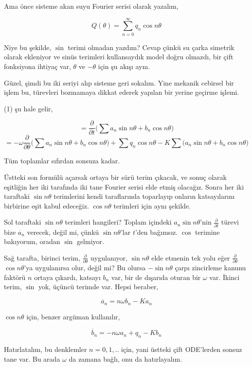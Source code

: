 \documentclass[12pt,fleqn]{article}\usepackage{../../common}
\begin{document}
Ama önce sisteme akan suyu Fourier serisi olarak yazalım, 

$$ 
Q(\theta) = \sum _{n=0}^{\infty} q_n \cos n\theta
$$

Niye bu şekilde, $\sin$ terimi olmadan yazdım?  Cevap çünkü su çarka
simetrik olarak ekleniyor ve sinüs terimleri kullansaydık model doğru
olmazdı, bir çift fonksiyona ihtiyaç var, $\theta$ ve $-\theta$ için şu
akışı aynı. 

Güzel, şimdi bu iki seriyi alıp sisteme geri sokalım. Yine mekanik cebirsel
bir işlem bu, türevleri bozmamaya dikkat ederek yapılan bir yerine geçirme
işlemi.

(1) şu hale gelir, 

$$ 
= \frac{\partial }{\partial t} \bigg(
\sum a_n \sin n\theta + b_n \cos n\theta 
\bigg) 
$$
$$ = 
- \omega \frac{\partial }{\partial \theta} 
\bigg( \sum a_n \sin n\theta + b_n \cos n\theta \bigg) + 
\sum  q_n \cos n\theta - 
K \sum \big( a_n \sin n\theta + b_n \cos n\theta \big)
$$

Tüm toplamlar sıfırdan sonsuza kadar. 

Üstteki son formülü açarsak ortaya bir sürü terim çıkacak, ve sonuç olarak
eşitliğin her iki tarafında iki tane Fourier serisi elde etmiş
olacağız. Sonra her iki taraftaki $\sin n\theta$ terimlerini kendi
taraflarında toparlayıp onların katsayılarını birbirine eşit kabul
edeceğiz. $\cos n\theta$ terimleri için aynı şekilde.

Sol taraftaki $\sin n\theta$ terimleri hangileri? Toplam içindeki
$a_n \sin n\theta $'nin $\frac{\partial }{\partial t}$ türevi bize
$\dot{a_n}$ verecek, değil mi, çünkü $\sin n\theta$'lar $t$'den
bağımsız. $\cos$ terimine bakıyorum, oradan $\sin$ gelmiyor.

Sağ tarafta, birinci terim, $\frac{\partial }{\partial \theta}$
uygulanıyor, $\sin n\theta$ elde etmenin tek yolu eğer
$\frac{\partial }{\partial \theta}$ $\cos n\theta$'ya uygulanırsa olur,
değil mi? Bu olursa $-\sin n\theta$ çarpı zincirleme kanunu faktörü $n$
ortaya çıkardı, katsayı $b_n$ var, bir de dışarıda oturan bir $\omega$
var. İkinci terim, $\sin$ yok, üçüncü terimde var. Hepsi beraber,

$$ 
\dot{a_n} = n \omega b_n - K a_n 
$$

$\cos n\theta$ için, benzer argüman kullanılır, 

$$ 
\dot{b_n} = -n \omega a_n + q_n - K b_n 
$$

Hatırlatalım, bu denklemler $n = 0,1,..$ için, yani üstteki çift ODE'lerden
sonsuz tane var. Bu arada $\omega$ da zamana bağlı, onu da hatırlayalım.
\end{document}
